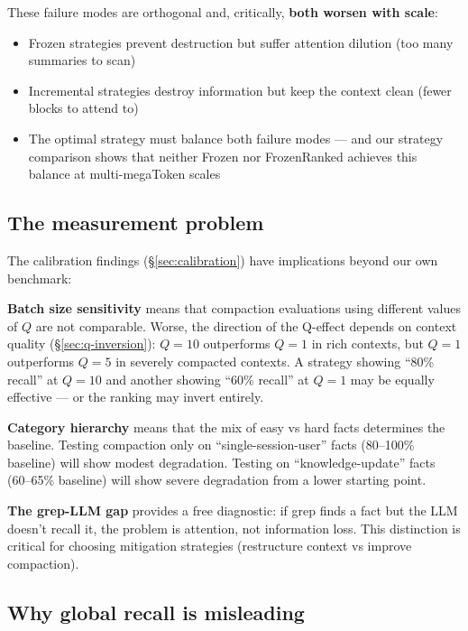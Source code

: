 These failure modes are orthogonal and, critically, \textbf{both worsen with
scale}:
\begin{itemize}
  \item Frozen strategies prevent destruction but suffer attention dilution
    (too many summaries to scan)
  \item Incremental strategies destroy information but keep the context clean
    (fewer blocks to attend to)
  \item The optimal strategy must balance both failure modes --- and our strategy
    comparison shows that neither Frozen nor FrozenRanked achieves this
    balance at multi-megaToken scales
\end{itemize}

\subsection{The measurement problem}
\label{sec:measurement-problem}

The calibration findings (\S\ref{sec:calibration}) have implications beyond our own benchmark:

\textbf{Batch size sensitivity} means that compaction evaluations using different
values of $Q$ are not comparable. Worse, the direction of the Q-effect depends
on context quality (\S\ref{sec:q-inversion}): $Q=10$ outperforms $Q=1$ in rich contexts, but $Q=1$
outperforms $Q=5$ in severely compacted contexts. A strategy showing ``80\%
recall'' at $Q=10$ and another showing ``60\% recall'' at $Q=1$ may be equally
effective --- or the ranking may invert entirely.

\textbf{Category hierarchy} means that the mix of easy vs hard facts determines
the baseline. Testing compaction only on ``single-session-user'' facts (80--100\%
baseline) will show modest degradation. Testing on ``knowledge-update'' facts
(60--65\% baseline) will show severe degradation from a lower starting point.

\textbf{The grep-LLM gap} provides a free diagnostic: if grep finds a fact but the
LLM doesn't recall it, the problem is attention, not information loss. This
distinction is critical for choosing mitigation strategies (restructure
context vs improve compaction).

\subsection{Why global recall is misleading}
\label{sec:global-misleading}

